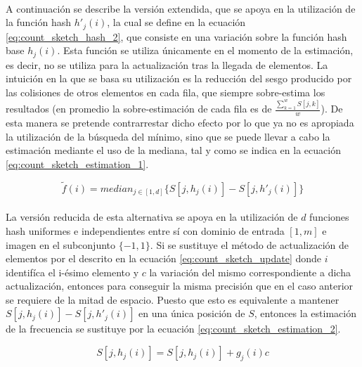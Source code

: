 \documentclass{subfiles}
\begin{document}
      \paragraph{}
      A continuación se describe la versión extendida, que se apoya en la utilización de la función hash $h'_j(i)$, la cual se define en la ecuación \eqref{eq:count_sketch_hash_2}, que consiste en una variación sobre la función hash base $h_j(i)$. Esta función se utiliza únicamente en el momento de la estimación, es decir, no se utiliza para la actualización tras la llegada de elementos. La intuición en la que se basa su utilización es la reducción del sesgo producido por las colisiones de otros elementos en cada fila, que siempre sobre-estima los resultados (en promedio la sobre-estimación de cada fila es de $\frac{\sum_{k=1}^wS[j,k]}{w}$). De esta manera se pretende contrarrestar dicho efecto por lo que ya no es apropiada la utilización de la búsqueda del mínimo, sino que se puede llevar a cabo la estimación mediante el uso de la mediana, tal y como se indica en la ecuación \eqref{eq:count_sketch_estimation_1}.

      \begin{equation}
      \label{eq:count_sketch_estimation_1}
        \widetilde{f}(i) = median_{j \in [1,d]}\{S[j, h_j(i)] - S[j, h'_j(i)]\}
      \end{equation}

      \paragraph{}
      La versión reducida de esta alternativa se apoya en la utilización de $d$ funciones hash uniformes e independientes entre sí con dominio de entrada $[1,m]$ e imagen en el subconjunto $\{-1,1\}$. Si se sustituye el método de actualización de elementos por el descrito en la ecuación \eqref{eq:count_sketch_update} donde $i$ identifíca el i-ésimo elemento y $c$ la variación del mismo correspondiente a dicha actualización, entonces para conseguir la misma precisión que en el caso anterior se requiere de la mitad de espacio. Puesto que esto es equivalente a mantener $S[j, h_j(i)] - S[j, h'_j(i)]$ en una única posición de $S$, entonces la estimación de la frecuencia se sustituye por la ecuación \eqref{eq:count_sketch_estimation_2}.

      \begin{equation}
      \label{eq:count_sketch_update}
        S[j,h_j(i)] = S[j,h_j(i)] +  g_j(i)c
      \end{equation}
\end{document}
